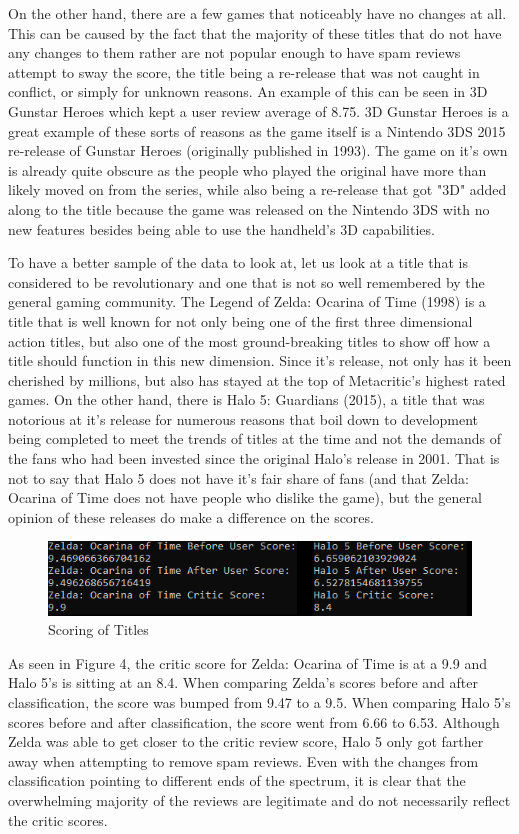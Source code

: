 \documentclass{article}
\begin{document}
On the other hand, there are a few games that noticeably have no changes at all. This can be caused by the fact that the majority of these titles that do not have any changes to them rather are not popular enough to have spam reviews attempt to sway the score, the title being a re-release that was not caught in conflict, or simply for unknown reasons. An example of this can be seen in 3D Gunstar Heroes which kept a user review average of 8.75. 3D Gunstar Heroes is a great example of these sorts of reasons as the game itself is a Nintendo 3DS 2015 re-release of Gunstar Heroes (originally published in 1993). The game on it's own is already quite obscure as the people who played the original have more than likely moved on from the series, while also being a re-release that got "3D" added along to the title because the game was released on the Nintendo 3DS with no new features besides being able to use the handheld's 3D capabilities. 
\par To have a better sample of the data to look at, let us look at a title that is considered to be revolutionary and one that is not so well remembered by the general gaming community. The Legend of Zelda: Ocarina of Time (1998) is a title that is well known for not only being one of the first three dimensional action titles, but also one of the most ground-breaking titles to show off how a title should function in this new dimension. Since it's release, not only has it been cherished by millions, but also has stayed at the top of Metacritic's highest rated games. On the other hand, there is Halo 5: Guardians (2015), a title that was notorious at it's release for numerous reasons that boil down to development being completed to meet the trends of titles at the time and not the demands of the fans who had been invested since the original Halo's release in 2001. That is not to say that Halo 5 does not have it's fair share of fans (and that Zelda: Ocarina of Time does not have people who dislike the game), but the general opinion of these releases do make a difference on the scores.
\begin{figure}[h]
        \centering
        \includegraphics[scale=.8]{comps.png}
        \caption{Scoring of Titles}
    \end{figure}
As seen in Figure 4, the critic score for Zelda: Ocarina of Time is at a 9.9 and Halo 5's is sitting at an 8.4. When comparing Zelda's scores before and after classification, the score was bumped from 9.47 to a 9.5. When comparing Halo 5's scores before and after classification, the score went from 6.66 to 6.53. Although Zelda was able to get closer to the critic review score, Halo 5 only got farther away when attempting to remove spam reviews. Even with the changes from classification pointing to different ends of the spectrum, it is clear that the overwhelming majority of the reviews are legitimate and do not necessarily reflect the critic scores.
\end{document}
